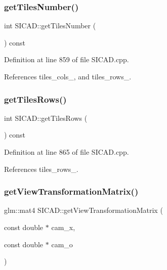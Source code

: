 \subsubsection{\texorpdfstring{get\+Tiles\+Number()}{getTilesNumber()}}
{\footnotesize\ttfamily int S\+I\+C\+A\+D\+::get\+Tiles\+Number (\begin{DoxyParamCaption}{ }\end{DoxyParamCaption}) const}



Definition at line 859 of file S\+I\+C\+A\+D.\+cpp.



References tiles\+\_\+cols\+\_\+, and tiles\+\_\+rows\+\_\+.

\mbox{\label{classSICAD_a9e3dd48dfd83ea0bd00d64dacc4fbd40}} 
\subsubsection{\texorpdfstring{get\+Tiles\+Rows()}{getTilesRows()}}
{\footnotesize\ttfamily int S\+I\+C\+A\+D\+::get\+Tiles\+Rows (\begin{DoxyParamCaption}{ }\end{DoxyParamCaption}) const}



Definition at line 865 of file S\+I\+C\+A\+D.\+cpp.



References tiles\+\_\+rows\+\_\+.

\mbox{\label{classSICAD_a1bdece095865249df4cb4e6a7ad2901e}} 
\subsubsection{\texorpdfstring{get\+View\+Transformation\+Matrix()}{getViewTransformationMatrix()}}
{\footnotesize\ttfamily glm\+::mat4 S\+I\+C\+A\+D\+::get\+View\+Transformation\+Matrix (\begin{DoxyParamCaption}\item[{const double $\ast$}]{cam\+\_\+x,  }\item[{const double $\ast$}]{cam\+\_\+o }\end{DoxyParamCaption})\hspace{0.3cm}{\ttfamily [private]}}



